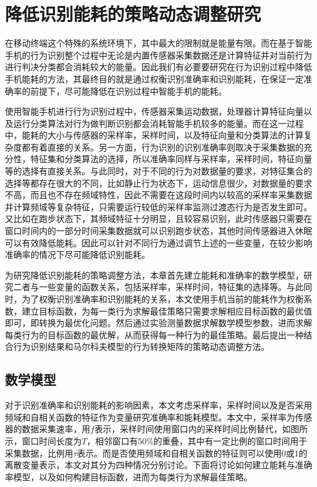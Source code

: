 \chapter{降低识别能耗的策略动态调整研究}
\par 在移动终端这个特殊的系统环境下，其中最大的限制就是能量有限。而在基于智能手机的行为识别整个过程中无论是内置传感器采集数据还是计算特征并对当前行为进行判决分类都会消耗较大的能量。因此我们有必要要研究在行为识别过程中降低手机能耗的方法，其最终目的就是通过权衡识别准确率和识别能耗，在保证一定准确率的前提下，尽可能降低在识别过程中智能手机的能耗。
\par 使用智能手机进行行为识别过程中，传感器采集运动数据，处理器计算特征向量以及运行分类算法对行为做判断识别都会消耗智能手机较多的能量。而在这一过程中，能耗的大小与传感器的采样率，采样时间，以及特征向量和分类算法的计算复杂度都有着直接的关系。另一方面，行为识别的识别准确率则取决于采集数据的充分性，特征集和分类算法的选择，所以准确率同样与采样率，采样时间，特征向量等的选择有直接关系。与此同时，对于不同的行为对数据量的要求，对特征集合的选择等都存在很大的不同，比如静止行为状态下，运动信息很少，对数据量的要求不高，而且也不存在频域特性，因此不需要在这段时间内以较高的采样率采集数据并计算频域等复杂特征，只需要运行较低的采样率监测过渡态行为是否发生即可。又比如在跑步状态下，其频域特征十分明显，且较容易识别，此时传感器只需要在窗口时间内的一部分时间采集数据就可以识别跑步状态，其他时间传感器进入休眠可以有效降低能耗。因此可以针对不同行为通过调节上述的一些变量，在较少影响准确率的情况下尽可能降低识别能耗。
\par 为研究降低识别能耗的策略调整方法，本章首先建立能耗和准确率的数学模型，研究二者与一些变量的函数关系，包括采样率，采样时间，特征集的选择等。与此同时，为了权衡识别准确率和识别能耗的关系，本文使用手机当前的能耗作为权衡系数，建立目标函数，为每一类行为求解最佳策略只需要求解相应目标函数的最优值即可，即转换为最优化问题。然后通过实验测量数据求解数学模型参数，进而求解每类行为的目标函数的最优解，从而获得每一种行为的最佳策略。最后提出一种结合行为识别结果和马尔科夫模型的行为转换矩阵的策略动态调整方法。

\section{数学模型}
\par 对于识别准确率和识别能耗的影响因素，本文考虑采样率，采样时间以及是否采用频域和自相关函数的特征作为变量研究准确率和能耗模型。本文中，采样率为传感器的数据采集速率，用$f$表示，采样时间使用窗口内的采样时间比例替代，如图所示，窗口时间长度为$T$，相邻窗口有50\%的重叠，其中有一定比例的窗口时间用于采集数据，比例用$\tau$表示。而是否使用频域和自相关函数的特征则可以使用0或1的离散变量表示，本文对其分为四种情况分别讨论。下面将讨论如何建立能耗与准确率模型，以及如何构建目标函数，进而为每类行为求解最佳策略。

